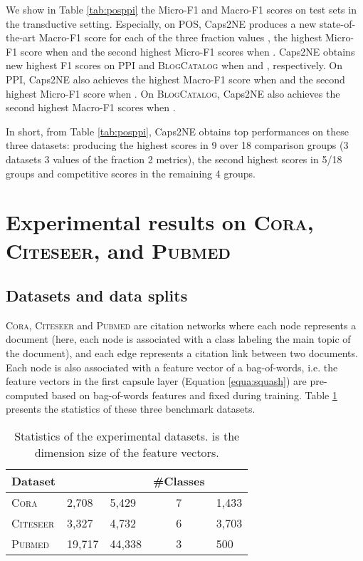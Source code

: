 \documentclass[sigconf]{acmart}
\begin{document}
We show in Table \ref{tab:posppi} the Micro-F1 and Macro-F1 scores on test sets in the transductive setting. Especially, on POS, Caps2NE produces a new state-of-the-art Macro-F1 score for each of the three fraction values , the highest Micro-F1 score when  and the second highest Micro-F1  scores when  . Caps2NE   obtains new highest F1 scores on PPI and \textsc{BlogCatalog} when  and , respectively. On PPI, Caps2NE also achieves the highest Macro-F1 score  when  and the second highest Micro-F1 score  when . On \textsc{BlogCatalog}, Caps2NE also achieves the second highest Macro-F1 scores  when   . 

In short, from Table \ref{tab:posppi}, Caps2NE obtains top performances on these  three datasets: producing the highest scores in 9 over 18 comparison groups (3 datasets  3 values of the fraction   2 metrics), the second  highest scores in 5/18 groups and competitive scores in the remaining 4 groups.


\section{Experimental results on \textsc{Cora, Citeseer}, and \textsc{Pubmed}}

\subsection{Datasets and data splits}

\textsc{Cora, Citeseer} \citep{sen2008collective} and \textsc{Pubmed} \citep{namata:mlg12} are citation networks where each node represents a document (here, each node is associated with a class labeling the main topic of the document), and each edge represents a citation link between two documents.  
Each node is also associated with a feature vector of a bag-of-words, i.e. the feature vectors  in the first capsule layer (Equation \ref{equa:squash}) are pre-computed based on bag-of-words features and fixed during training.
Table \ref{tab:graphdatasets} presents the statistics of these three benchmark datasets.

\begin{table}[!ht]
\centering
\caption{Statistics of the experimental datasets.  is the dimension size of the feature vectors.}
\def\arraystretch{1.1}
\begin{tabular}{l|llcl}
\hline
\bf Dataset &  \bf{} & \bf{} & {\#Classes} & \\
\hline
\textsc{Cora} & 2,708 & 5,429 & 7 & 1,433\\
\textsc{Citeseer} & 3,327 & 4,732 & 6 & 3,703\\
\textsc{Pubmed} & 19,717 & 44,338 & 3 & 500\\
\hline
\end{tabular}
\label{tab:graphdatasets}
\end{table}
\end{document}
